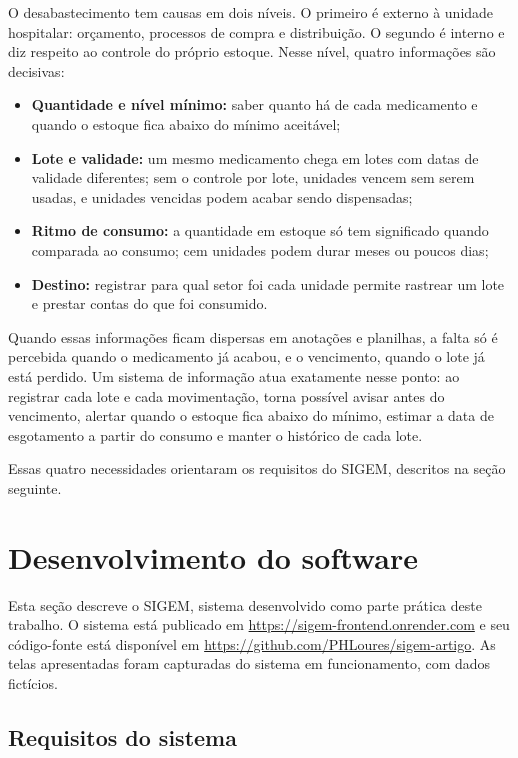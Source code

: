 \documentclass[12pt,a4paper]{article}
\begin{document}
O desabastecimento tem causas em dois níveis. O primeiro é externo à unidade hospitalar: orçamento, processos de compra e distribuição. O segundo é interno e diz respeito ao controle do próprio estoque. Nesse nível, quatro informações são decisivas:

\begin{itemize}
  \item \textbf{Quantidade e nível mínimo:} saber quanto há de cada medicamento e quando o estoque fica abaixo do mínimo aceitável;
  \item \textbf{Lote e validade:} um mesmo medicamento chega em lotes com datas de validade diferentes; sem o controle por lote, unidades vencem sem serem usadas, e unidades vencidas podem acabar sendo dispensadas;
  \item \textbf{Ritmo de consumo:} a quantidade em estoque só tem significado quando comparada ao consumo; cem unidades podem durar meses ou poucos dias;
  \item \textbf{Destino:} registrar para qual setor foi cada unidade permite rastrear um lote e prestar contas do que foi consumido.
\end{itemize}

Quando essas informações ficam dispersas em anotações e planilhas, a falta só é percebida quando o medicamento já acabou, e o vencimento, quando o lote já está perdido. Um sistema de informação atua exatamente nesse ponto: ao registrar cada lote e cada movimentação, torna possível avisar antes do vencimento, alertar quando o estoque fica abaixo do mínimo, estimar a data de esgotamento a partir do consumo e manter o histórico de cada lote.

Essas quatro necessidades orientaram os requisitos do SIGEM, descritos na seção seguinte.

\section{Desenvolvimento do software}

Esta seção descreve o SIGEM, sistema desenvolvido como parte prática deste trabalho. O sistema está publicado em \url{https://sigem-frontend.onrender.com} e seu código-fonte está disponível em \url{https://github.com/PHLoures/sigem-artigo}. As telas apresentadas foram capturadas do sistema em funcionamento, com dados fictícios.

\subsection{Requisitos do sistema}
\end{document}
